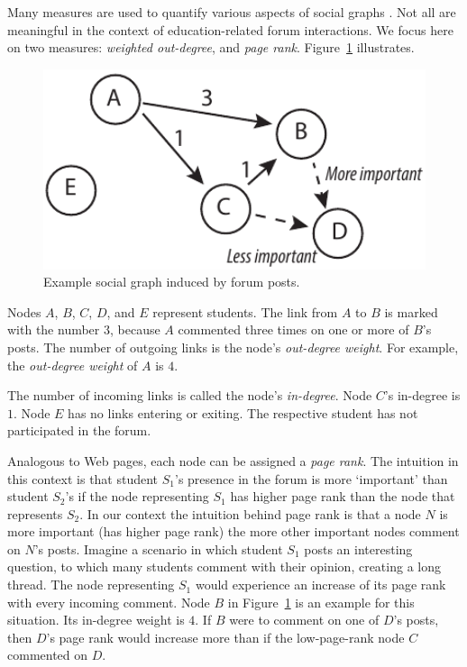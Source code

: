 Many measures are used to quantify various aspects of social graphs
\cite{hann2005, lesk14}. Not all are meaningful in the context of
education-related forum interactions. We focus here on two measures:
{\em weighted out-degree}, and {\em page
  rank}. Figure~\ref{fig:forumGraph} illustrates.
\begin{figure}[]
       \centering
       \includegraphics[width=1.0\textwidth]{Figs/forumNetworkExample.pdf}
       \caption{\textnormal{Example social graph induced by forum posts.}}
       \label{fig:forumGraph}
\end{figure}
Nodes $A$, $B$, $C$, $D$, and $E$ represent students. The link from
$A$ to $B$ is marked with the number $3$, because $A$ commented three
times on one or more of $B$'s posts. The number of outgoing links is
the node's {\em out-degree weight}. For example, the {\em out-degree
  weight} of $A$ is $4$.

The number of incoming links is called the node's {\em
  in-degree}. Node $C$'s in-degree is $1$. Node $E$ has no links
entering or exiting. The respective student has not participated in
the forum.

Analogous to Web pages, each node can be assigned a {\em page
  rank}. The intuition in this context is that student $S_1$'s
presence in the forum is more `important' than student $S_2$'s if the
node representing $S_1$ has higher page rank than the node that
represents $S_2$. In our context the intuition behind page rank is
that a node $N$ is more important (has higher page rank) the more
other important nodes comment on $N$'s posts. Imagine a scenario in
which student $S_1$ posts an interesting question, to which many
students comment with their opinion, creating a long thread. The node
representing $S_1$ would experience an increase of its page rank with
every incoming comment. Node $B$ in Figure~\ref{fig:forumGraph} is an
example for this situation. Its in-degree weight is $4$. If $B$ were
to comment on one of $D$'s posts, then $D$'s page rank would increase
more than if the low-page-rank node $C$ commented on $D$.

